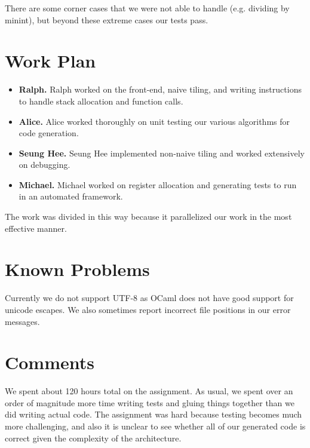 \documentclass{hw}
\begin{document}
There are some corner cases that we were not able to handle (e.g. dividing by minint), but
beyond these extreme cases our tests pass.
\section{Work Plan}\label{sec:workplan}
\begin{itemize}
  \item \textbf{Ralph.}
    Ralph worked on the front-end, naive tiling, and writing instructions to 
    handle stack allocation and function calls.

  \item \textbf{Alice.}
    Alice worked thoroughly on unit testing our various algorithms for code generation.

  \item \textbf{Seung Hee.}
    Seung Hee implemented non-naive tiling and worked extensively on debugging.

  \item \textbf{Michael.}
    Michael worked on register allocation and generating tests to run in an
    automated framework.
\end{itemize}

The work was divided in this way because it parallelized our work in the most
effective manner.

\section{Known Problems}\label{sec:problems}
Currently we do not support UTF-8 as OCaml does not have good support for
unicode escapes. We also sometimes report incorrect file positions in our error
messages.

\section{Comments}\label{sec:comments}
We spent about 120 hours total on the assignment. As usual, we spent over an
order of magnitude more time writing tests and gluing things together than we
did writing actual code. The assignment was hard because testing becomes much
more challenging, and also it is unclear to see whether all of our generated
code is correct given the complexity of the architecture.
\end{document}
